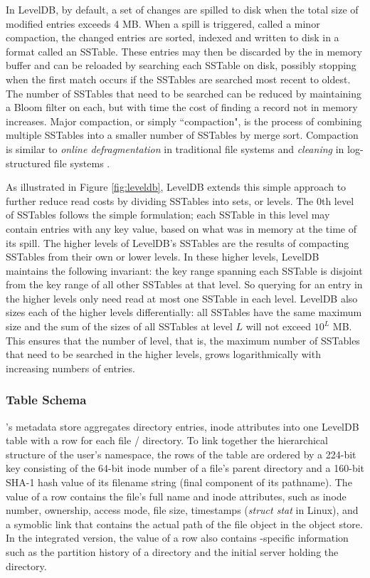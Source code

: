 In LevelDB, by default, a set of changes are spilled to disk when the total size of modified entries exceeds 4 MB.  When a spill is triggered, called a minor compaction, the changed entries are sorted, indexed and written to disk in a format called an SSTable\citep{BigTable}.  These entries may then be discarded by the in memory buffer and can be reloaded by searching each SSTable on disk, possibly stopping when the first match occurs if the SSTables are searched most recent to oldest.  The number of SSTables that need to be searched can be reduced by maintaining a Bloom filter\citep{bloomfilter} on each, but with time the cost of finding a record not in memory increases.  Major compaction, or simply ``compaction", is the process of combining multiple SSTables into a smaller number of SSTables by merge sort. Compaction is similar to \emph{online defragmentation} in traditional file systems and \emph{cleaning} in log-structured file systems \citep{LFS}.

As illustrated in Figure \ref{fig:leveldb}, LevelDB extends this simple approach to further reduce read costs by dividing SSTables into sets, or levels.
The 0th level of SSTables follows the simple formulation; each SSTable in this level may contain entries with any key value, based on what was in memory at the time of its spill.
The higher levels of LevelDB's SSTables are the results of compacting SSTables from their own or lower levels.
In these higher levels, LevelDB maintains the following invariant: the key range spanning each SSTable is disjoint from the key range of all other SSTables at that level.
So querying for an entry in the higher levels only need read at most one SSTable in each level.
LevelDB also sizes each of the higher levels differentially:  all SSTables have the same maximum size and the sum of the sizes of all SSTables at level $L$ will not exceed $10^L$ MB.
This ensures that the number of level, that is, the maximum number of SSTables that need to be searched in the higher levels, grows logarithmically with increasing numbers of entries.

\subsubsection*{Table Schema} 

\tfs's metadata store aggregates directory entries, 
inode attributes into one LevelDB table with a row for each file / directory.
To link together the hierarchical structure of the user's namespace,
the rows of the table are ordered by a 224-bit key consisting of 
the 64-bit inode number of a file's parent directory 
and a 160-bit SHA-1 hash value of its filename string (final component of its pathname).
The value of a row contains the file's full name and inode attributes,
such as inode number, ownership, access mode, file size, timestamps (\textit{struct stat} in Linux),
and a symoblic link that contains the actual path of the file object in the object store.
In the integrated version, the value of a row also contains \giga-specific information 
such as the partition history of a directory and the initial server holding the directory.

